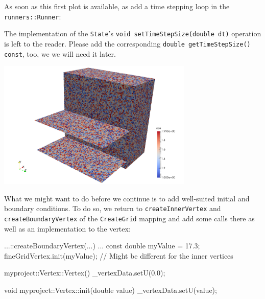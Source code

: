 As soon as this first plot is available, as add a time stepping loop in the
\texttt{runners::Runner}:


\noindent
The implementation of the \texttt{State}'s \texttt{void setTimeStepSize(double
dt)} operation is left to the reader. 
Please add the corresponding \texttt{double getTimeStepSize() const}, too, we we
will need it later.

\begin{center}
  \includegraphics[width=0.7\textwidth]{41_heat-equation/epsilon.png}
\end{center}

\noindent
What we might want to do before we continue is to add well-suited initial and
boundary conditions. 
To do so, we return to \texttt{createInnerVertex} and
\texttt{createBoundaryVertex} of the \texttt{CreateGrid} mapping and add some
calls there as well as an implementation to the vertex:

\begin{code}
...::createBoundaryVertex(...) {
  ...
  const double myValue = 17.3;
  fineGridVertex.init(myValue); // Might be different for the inner vertices
}


myproject::Vertex::Vertex() {
  _vertexData.setU(0.0);
}


void myproject::Vertex::init(double value) {
  _vertexData.setU(value);
}
\end{code}

